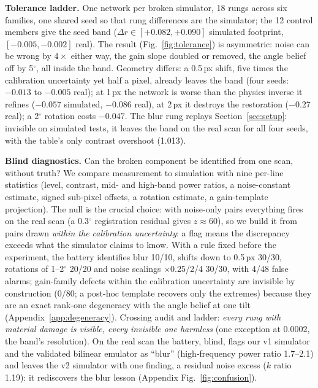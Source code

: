 \documentclass{article}
\begin{document}
\textbf{Tolerance ladder.} One network per broken simulator, 18 rungs across six families, one shared seed so that rung differences are the simulator; the 12 control members give the seed band ($\Delta r \in [+0.082, +0.090]$ simulated footprint, $[-0.005, -0.002]$ real). The result (Fig.~\ref{fig:tolerance}) is asymmetric: noise can be wrong by $4\times$ either way, the gain slope doubled or removed, the angle belief off by 5$^\circ$, all inside the band. Geometry differs: a 0.5\,px shift, five times the calibration uncertainty yet half a pixel, already leaves the band (four seeds: $-0.013$ to $-0.005$ real); at 1\,px the network is worse than the physics inverse it refines ($-0.057$ simulated, $-0.086$ real), at 2\,px it destroys the restoration ($-0.27$ real); a 2$^\circ$ rotation costs $-0.047$. The blur rung replays Section~\ref{sec:setup}: invisible on simulated tests, it leaves the band on the real scan for all four seeds, with the table's only contrast overshoot (1.013).

\textbf{Blind diagnostics.} Can the broken component be identified from one scan, without truth? We compare measurement to simulation with nine per-line statistics (level, contrast, mid- and high-band power ratios, a noise-constant estimate, signed sub-pixel offsets, a rotation estimate, a gain-template projection). The null is the crucial choice: with noise-only pairs everything fires on the real scan (a 0.3$^\circ$ registration residual gives $z\approx60$), so we build it from pairs drawn \emph{within the calibration uncertainty}: a flag means the discrepancy exceeds what the simulator claims to know. With a rule fixed before the experiment, the battery identifies blur 10/10, shifts down to 0.5\,px 30/30, rotations of 1--2$^\circ$ 20/20 and noise scalings $\times$0.25/2/4 30/30, with 4/48 false alarms; gain-family defects within the calibration uncertainty are invisible by construction (0/80; a post-hoc template recovers only the extremes) because they are an exact rank-one degeneracy with the angle belief at one tilt (Appendix~\ref{app:degeneracy}). Crossing audit and ladder: \emph{every rung with material damage is visible, every invisible one harmless} (one exception at 0.0002, the band's resolution). On the real scan the battery, blind, flags our v1 simulator and the validated bilinear emulator as ``blur'' (high-frequency power ratio 1.7--2.1) and leaves the v2 simulator with one finding, a residual noise excess ($k$ ratio 1.19): it rediscovers the blur lesson (Appendix Fig.~\ref{fig:confusion}).
\end{document}
